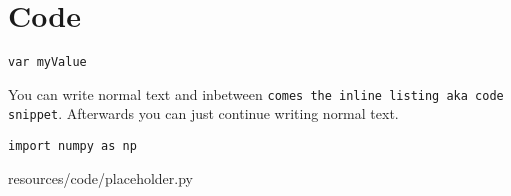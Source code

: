 \cite[1-4]{doku}


\section{Code}
\lstinline$var myValue$

You can write normal text and inbetween \lstinline$comes the inline listing aka code snippet$. Afterwards you can just continue writing normal text.

\begin{lstlisting}[caption={My caption}, label={lst:my-label-1}]
    import numpy as np
\end{lstlisting}


                {resources/code/placeholder.py}
